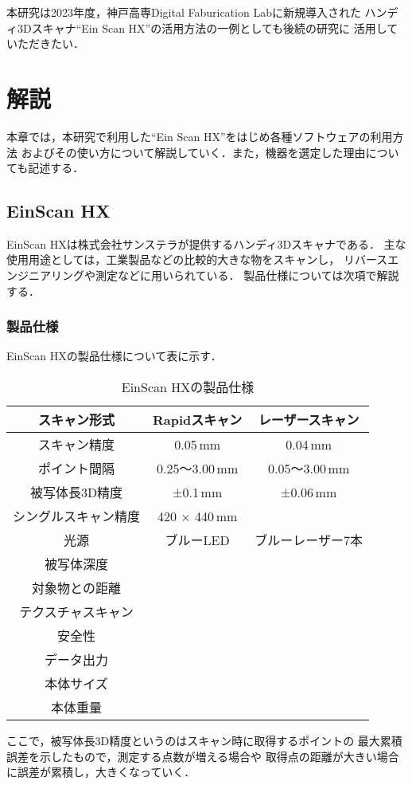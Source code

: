 \documentclass{ltjsreport}
\begin{document}
	本研究は2023年度，神戸高専Digital Faburication Labに新規導入された
	ハンディ3Dスキャナ``Ein Scan HX''の活用方法の一例としても後続の研究に
	活用していただきたい．

\chapter{解説}
	本章では，本研究で利用した``Ein Scan HX''をはじめ各種ソフトウェアの利用方法
	およびその使い方について解説していく．また，機器を選定した理由についても記述する．

	\section{EinScan HX}
		EinScan HXは株式会社サンステラが提供するハンディ3Dスキャナである．
		主な使用用途としては，工業製品などの比較的大きな物をスキャンし，
		リバースエンジニアリングや測定などに用いられている．
		製品仕様については次項で解説する．

		\subsection{製品仕様}
			EinScan HXの製品仕様について表に示す．
			\begin{table}[H]
			\begin{center}
			\caption{EinScan HXの製品仕様}
			\label{tab:EinScan}
			\begin{tabular}{c|cc} \toprule
				スキャン形式&Rapidスキャン&レーザースキャン\\ \hline
				スキャン精度&0.05\,mm&0.04\,mm\\
				ポイント間隔&0.25～3.00\,mm&0.05～3.00\,mm\\
				被写体長3D精度&±0.1\,mm&±0.06\,mm\\
				シングルスキャン精度&420 × 440\,mm&\\
				光源&ブルーLED&ブルーレーザー7本\\
				被写体深度&&\\
				対象物との距離&&\\
				テクスチャスキャン&&\\
				安全性&&\\
				データ出力&&\\
				本体サイズ&&\\
				本体重量&&\\
				\bottomrule
			\end{tabular}
			\end{center}
			\end{table}
			ここで，被写体長3D精度というのはスキャン時に取得するポイントの
			最大累積誤差を示したもので，測定する点数が増える場合や
			取得点の距離が大きい場合に誤差が累積し，大きくなっていく．
\end{document}
